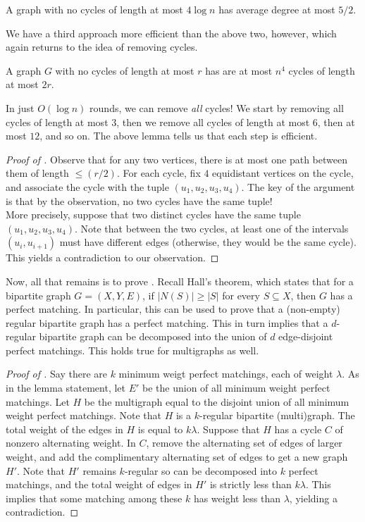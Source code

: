 			\begin{flem}
				A graph with no cycles of length at most $4 \log n$ has average degree at most $5/2$.
			\end{flem}

			We have a third approach more efficient than the above two, however, which again returns to the idea of removing cycles.

			\begin{flem}
				\label{lemma: teo koh}
				A graph $G$ with no cycles of length at most $r$ has are at most $n^4$ cycles of length at most $2r$. 
			\end{flem}

			In just $O(\log n)$ rounds, we can remove \emph{all} cycles! We start by removing all cycles of length at most $3$, then we remove all cycles of length at most $6$, then at most $12$, and so on. The above lemma tells us that each step is efficient.

			\begin{proof}[Proof of ]
				Observe that for any two vertices, there is at most one path between them of length $\le (r/2)$. For each cycle, fix $4$ equidistant vertices on the cycle, and associate the cycle with the tuple $(u_1,u_2,u_3,u_4)$. The key of the argument is that by the observation, no two cycles have the same tuple!\\
				More precisely, suppose that two distinct cycles have the same tuple $(u_1,u_2,u_3,u_4)$. Note that between the two cycles, at least one of the intervals $(u_i,u_{i+1})$ must have different edges (otherwise, they would be the same cycle). This yields a contradiction to our observation.
			\end{proof}

			Now, all that remains is to prove . Recall Hall's theorem, which states that for a bipartite graph $G = (X,Y,E)$, if $|N(S)| \ge |S|$ for every $S \subseteq X$, then $G$ has a perfect matching. In particular, this can be used to prove that a (non-empty) regular bipartite graph has a perfect matching. This in turn implies that a $d$-regular bipartite graph can be decomposed into the union of $d$ edge-disjoint perfect matchings. This holds true for multigraphs as well.

			\begin{proof}[Proof of ]
				Say there are $k$ minimum weigt perfect matchings, each of weight $\lambda$. As in the lemma statement, let $E'$ be the union of all minimum weight perfect matchings. Let $H$ be the multigraph equal to the disjoint union of all minimum weight perfect matchings. Note that $H$ is a $k$-regular bipartite (multi)graph. The total weight of the edges in $H$ is equal to $k\lambda$. Suppose that $H$ has a cycle $C$ of nonzero alternating weight. In $C$, remove the alternating set of edges of larger weight, and add the complimentary alternating set of edges to get a new graph $H'$. Note that $H'$ remains $k$-regular so can be decomposed into $k$ perfect matchings, and the total weight of edges in $H'$ is strictly less than $k\lambda$. This implies that some matching among these $k$ has weight less than $\lambda$, yielding a contradiction.
			\end{proof}